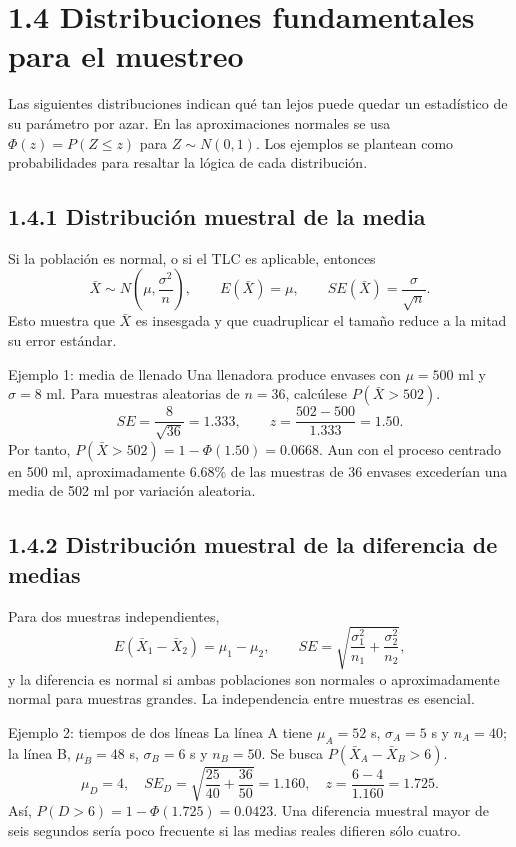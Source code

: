 \section{1.4 Distribuciones fundamentales para el muestreo}
Las siguientes distribuciones indican qué tan lejos puede quedar un estadístico de su parámetro por azar. En las aproximaciones normales se usa $\Phi(z)=P(Z\le z)$ para $Z\sim N(0,1)$. Los ejemplos se plantean como probabilidades para resaltar la lógica de cada distribución.

\subsection{1.4.1 Distribución muestral de la media}
Si la población es normal, o si el TLC es aplicable, entonces
\[
 \bar X\sim N\!\left(\mu,\frac{\sigma^2}{n}\right),\qquad
 E(\bar X)=\mu,\qquad SE(\bar X)=\frac{\sigma}{\sqrt n}.
\]
Esto muestra que $\bar X$ es insesgada y que cuadruplicar el tamaño reduce a la mitad su error estándar.

\begin{examplebox}{Ejemplo 1: media de llenado}
Una llenadora produce envases con $\mu=500$ ml y $\sigma=8$ ml. Para muestras aleatorias de $n=36$, calcúlese $P(\bar X>502)$.
\[
 SE=\frac{8}{\sqrt{36}}=1.333,\qquad
 z=\frac{502-500}{1.333}=1.50.
\]
Por tanto, $P(\bar X>502)=1-\Phi(1.50)=0.0668$. Aun con el proceso centrado en 500 ml, aproximadamente 6.68\% de las muestras de 36 envases excederían una media de 502 ml por variación aleatoria.
\end{examplebox}

\subsection{1.4.2 Distribución muestral de la diferencia de medias}
Para dos muestras independientes,
\[
 E(\bar X_1-\bar X_2)=\mu_1-\mu_2,\qquad
 SE=\sqrt{\frac{\sigma_1^2}{n_1}+\frac{\sigma_2^2}{n_2}},
\]
y la diferencia es normal si ambas poblaciones son normales o aproximadamente normal para muestras grandes. La independencia entre muestras es esencial.

\begin{examplebox}{Ejemplo 2: tiempos de dos líneas}
La línea A tiene $\mu_A=52$ s, $\sigma_A=5$ s y $n_A=40$; la línea B, $\mu_B=48$ s, $\sigma_B=6$ s y $n_B=50$. Se busca $P(\bar X_A-\bar X_B>6)$.
\[
 \mu_D=4,\quad SE_D=\sqrt{\frac{25}{40}+\frac{36}{50}}=1.160,
 \quad z=\frac{6-4}{1.160}=1.725.
\]
Así, $P(D>6)=1-\Phi(1.725)=0.0423$. Una diferencia muestral mayor de seis segundos sería poco frecuente si las medias reales difieren sólo cuatro.
\end{examplebox}


